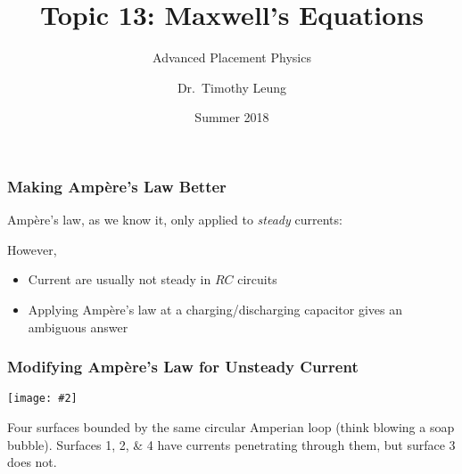 \documentclass[12pt,aspectratio=169]{beamer}
\title{Topic 13: Maxwell's Equations}
\subtitle{Advanced Placement Physics}
\author[TML]{Dr.\ Timothy Leung}
\institute{Olympiads School}
\date{Summer 2018}
\newcommand{\pic}[2]{\texttt{[image: \#2]}}\newcommand{\mb}[1]{\mathbf{#1}}
\newcommand{\eq}[2]{\vspace{#1}{\Large\begin{displaymath}#2\end{displaymath}}}
\begin{document}
\begin{frame}
  \maketitle
\end{frame}



%


\begin{frame}
  \frametitle{Making Amp\`{e}re's Law Better}

  Amp\`{e}re's law, as we know it, only applied to \emph{steady} currents:

  \eq{-.1in}{
    \oint_C \mb{B}\cdot d\boldsymbol{\ell}=\mu_0 I_c
  }
  However,
  \begin{itemize}
  \item Current are usually not steady in $RC$ circuits
  \item Applying Amp\`{e}re's law at a charging/discharging capacitor gives an
    ambiguous answer
  \end{itemize}
\end{frame}

\begin{frame}
  \frametitle{Modifying Amp\`{e}re's Law for Unsteady Current}

  \begin{center}
    \pic{.3}{mag_displacement_fig3.jpg}
  \end{center}

  \vspace{-.15in}Four surfaces bounded by the same circular Amperian loop
  (think blowing a soap bubble). Surfaces \numlist{1;2;4} have currents
  penetrating through them, but surface \num{3} does not.
\end{frame}
\end{document}
